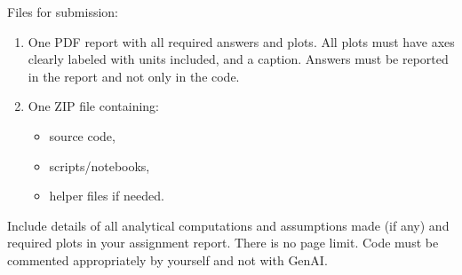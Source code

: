 \documentclass{article}
\begin{document}
\quad

\noindent Files for submission:  

\begin{enumerate} [1.]
    \item One PDF report with all required answers and plots. All plots must have axes clearly labeled with units included, and a caption. Answers must be reported in the report and not only in the code.  
    \item One ZIP file containing:
    \begin{itemize}
        \item source code,
        \item scripts/notebooks,  
        \item helper files if needed.  
    \end{itemize}
\end{enumerate}
Include details of all analytical computations and assumptions made (if any) and required plots in your assignment report. There is no page limit. Code must be commented appropriately by yourself and not with GenAI.  
\end{document}
